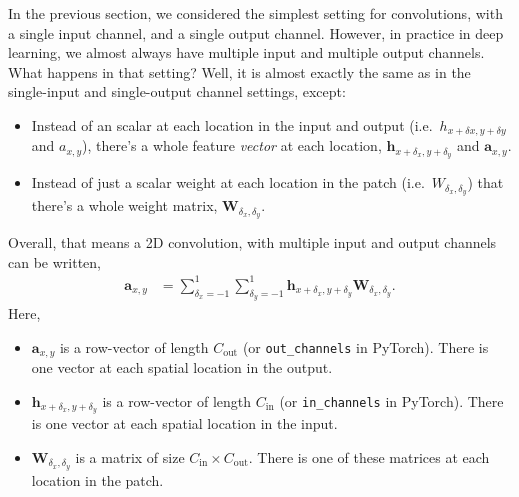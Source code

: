\documentclass{article}
\newcommand{\W}{\mathbf{W}}
\renewcommand{\a}{\mathbf{a}}
\newcommand{\h}{\mathbf{h}}
\newcommand{\Cin}{C_\text{in}}
\newcommand{\Cout}{C_\text{out}}
\begin{document}
In the previous section, we considered the simplest setting for convolutions, with a single input channel, and a single output channel.
However, in practice in deep learning, we almost always have multiple input and multiple output channels.
What happens in that setting?
Well, it is almost exactly the same as in the single-input and single-output channel settings, except: 
\begin{itemize}
  \item Instead of an scalar at each location in the input and output (i.e.\ $h_{x+\delta x,y+\delta y}$ and $a_{x,y}$), there's a whole feature \textit{vector} at each location, $\h_{x+\delta_x, y+\delta_y}$ and $\a_{x,y}$.
  \item Instead of just a scalar weight at each location in the patch (i.e.\ $W_{\delta_x, \delta_y}$) that there's a whole weight matrix, $\W_{\delta_x, \delta_y}$.
\end{itemize}
Overall, that means a 2D convolution, with multiple input and output channels can be written,
\begin{align}
  \a_{x,y} &= \sum_{\delta_x=-1}^1 \sum_{\delta_y=-1}^1 \h_{x+\delta_x, y+\delta_y} \W_{\delta_x, \delta_y}.
\end{align}
Here,
\begin{itemize}
  \item $\a_{x, y}$ is a row-vector of length $\Cout$ (or \verb|out_channels| in PyTorch).  There is one vector at each spatial location in the output.
  \item $\h_{x+\delta_x, y+\delta_y}$ is a row-vector of length $\Cin$ (or \verb|in_channels| in PyTorch).  There is one vector at each spatial location in the input.
  \item $\W_{\delta_x, \delta_y}$ is a matrix of size $\Cin \times \Cout$.  There is one of these matrices at each location in the patch.
\end{itemize}
\end{document}
